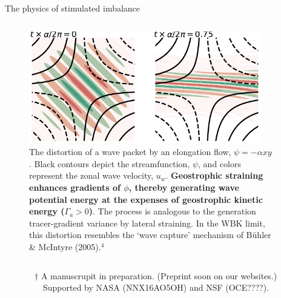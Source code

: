 \documentclass[final]{beamer}
\begin{document}
\begin{frame}[t]
\begin{columns}[t]
\begin{column}{0.425\paperwidth}
{\begin{alertblock}{The physics of stimulated imbalance}
\begin{columns}
                \begin{column}{0.535\textwidth}
                  \vskip1.75cm
                  \begin{figure}
                    \includegraphics[width=0.95\textwidth]{figs/Gamma_a.pdf}
                    \caption{The distortion of a wave packet by an elongation flow,
                    $\psi = -\alpha xy$.
                    Black contours depict the
                    streamfunction, $\psi$, and colors represent the zonal wave velocity,
                    $u_w$.
                              \textbf{Geostrophic straining enhances gradients of $\phi$,
                              thereby generating wave potential energy at the expenses
                              of geostrophic kinetic energy ($\Gamma_a>0$)}. The
                              process is analogous to the generation tracer-gradient
                              variance by lateral straining. In the WBK limit, this
                              distortion resembles the `wave capture' mechanism of
                              B{\"u}hler \& McIntyre (2005).$^4$}
                  \end{figure}
                \end{column}

                \end{columns}
      \end{alertblock}
      }
      \vskip0.5cm
      ~~~~~~~$\dagger$ A manuscrupit in preparation. (Preprint soon on our websites.)\\
      ~~~~~~~~~Supported by NASA (NNX16AO5OH) and NSF (OCE????).
    \end{column}


    \hspace{1.cm}

    \begin{column}{0.55\textwidth}


\end{column}
\end{columns}
\end{frame}
\end{document}
